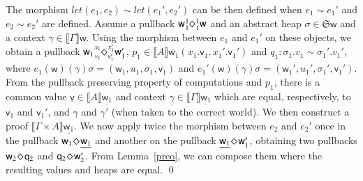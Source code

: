 \documentclass[orivec]{llncs}
\newcommand{\sq}[4]{\tensor*[^{#1}_{#2}]{\Diamond}{^{#3}_{#4}}}
\newcommand{\und}[1]{\underline{#1}}
\newcommand{\sem}[1]{\ensuremath{\llbracket {#1} \rrbracket}}
\renewenvironment{proof}{\vspace{-1mm} \noindent {\bf Proof}\quad}{\qed}
\newcommand\w{\ensuremath{\mathsf{w}}\xspace}
\newcommand\q{\ensuremath{\mathsf{q}}\xspace}
\newcommand{\Astores}{\mathfrak{S}}
\newcommand\val{\ensuremath{\mathsf{v}}\xspace}
\begin{document}
\begin{proof}
The morphism ${\textit{let}(e_1,e_2)\sim
\textit{let}(e_1',e_2')}$ can be then defined when ${e_1 \sim e_1'}$
and ${e_2 \sim e_2'}$ are defined.
Assume a pullback $\w \sq{1}{1}{1}{1}\w$ and an abstract heap $\sigma \in
\Astores \w$ and a context $\gamma \in \sem{\Gamma}\w$. Using the
morphism between $e_1$ and $e_1'$ on these objects, we obtain a
pullback $\w_1 \sq{x_1}{v_1}{x_1'}{v_1'} \w_1'$, $p_1 \in
\sem{A}\overline{\w_1}(x_1.\val_1, x_1'.\val_1')$ and $q_1 : \sigma_1.v_1
\sim \sigma_1'.v_1'$, where ${e_1}(\w)(\gamma)\sigma = (\w_1, u_1,
\sigma_1,
\val_1)$ and ${e_1'}(\w)(\gamma)\sigma = (\w_1', u_1', \sigma_1',
\val_1')$. 
From the pullback preserving property of computations and $p_1$,
there is a common value $\und{\val} \in \sem{A}\und{\w_1}$ and context
$\und{\gamma} \in \sem{\Gamma}\und{\w_1}$ which are equal, respectively, to
$\val_1$ and $\val_1'$, and $\gamma$ and $\gamma'$ (when taken to the
correct world). We then construct a
proof $\sem{\Gamma \times A} \und{\w_1}$. We now apply twice the
morphism between $e_2$ and $e_2'$ once in the pullback $\w_1 \sq{}{}{}{}
\und{\w_1}$ and
another on the
pullback $\und{\w_1} \sq{}{}{}{} \w_1'$, obtaining two pullbacks
$\w_2 \sq{}{}{}{} \q_2$ and $\q_2 \sq{}{}{}{} \w_2'$. From
Lemma~\ref{preo}, we can compose them where the resulting values and
heaps are equal.
\end{proof}
\end{document}
